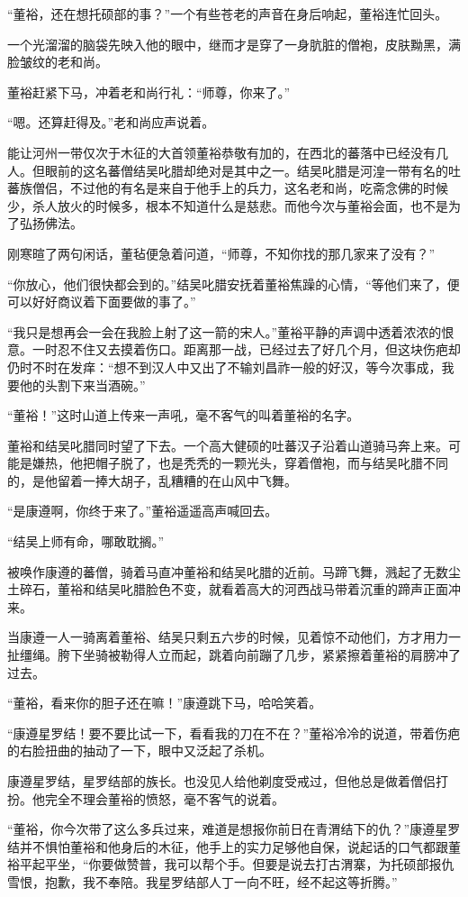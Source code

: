 “董裕，还在想托硕部的事？”一个有些苍老的声音在身后响起，董裕连忙回头。

一个光溜溜的脑袋先映入他的眼中，继而才是穿了一身肮脏的僧袍，皮肤黝黑，满脸皱纹的老和尚。

董裕赶紧下马，冲着老和尚行礼：“师尊，你来了。”

“嗯。还算赶得及。”老和尚应声说着。

能让河州一带仅次于木征的大首领董裕恭敬有加的，在西北的蕃落中已经没有几人。但眼前的这名蕃僧结吴叱腊却绝对是其中之一。结吴叱腊是河湟一带有名的吐蕃族僧侣，不过他的有名是来自于他手上的兵力，这名老和尚，吃斋念佛的时候少，杀人放火的时候多，根本不知道什么是慈悲。而他今次与董裕会面，也不是为了弘扬佛法。

刚寒暄了两句闲话，董毡便急着问道，“师尊，不知你找的那几家来了没有？”

“你放心，他们很快都会到的。”结吴叱腊安抚着董裕焦躁的心情，“等他们来了，便可以好好商议着下面要做的事了。”

“我只是想再会一会在我脸上射了这一箭的宋人。”董裕平静的声调中透着浓浓的恨意。一时忍不住又去摸着伤口。距离那一战，已经过去了好几个月，但这块伤疤却仍时不时在发痒：“想不到汉人中又出了不输刘昌祚一般的好汉，等今次事成，我要他的头割下来当酒碗。”

“董裕！”这时山道上传来一声吼，毫不客气的叫着董裕的名字。

董裕和结吴叱腊同时望了下去。一个高大健硕的吐蕃汉子沿着山道骑马奔上来。可能是嫌热，他把帽子脱了，也是秃秃的一颗光头，穿着僧袍，而与结吴叱腊不同的，是他留着一捧大胡子，乱糟糟的在山风中飞舞。

“是康遵啊，你终于来了。”董裕遥遥高声喊回去。

“结吴上师有命，哪敢耽搁。”

被唤作康遵的蕃僧，骑着马直冲董裕和结吴叱腊的近前。马蹄飞舞，溅起了无数尘土碎石，董裕和结吴叱腊脸色不变，就看着高大的河西战马带着沉重的蹄声正面冲来。

当康遵一人一骑离着董裕、结吴只剩五六步的时候，见着惊不动他们，方才用力一扯缰绳。胯下坐骑被勒得人立而起，跳着向前蹦了几步，紧紧擦着董裕的肩膀冲了过去。

“董裕，看来你的胆子还在嘛！”康遵跳下马，哈哈笑着。

“康遵星罗结！要不要比试一下，看看我的刀在不在？”董裕冷冷的说道，带着伤疤的右脸扭曲的抽动了一下，眼中又泛起了杀机。

康遵星罗结，星罗结部的族长。也没见人给他剃度受戒过，但他总是做着僧侣打扮。他完全不理会董裕的愤怒，毫不客气的说着。

“董裕，你今次带了这么多兵过来，难道是想报你前日在青渭结下的仇？”康遵星罗结并不惧怕董裕和他身后的木征，他手上的实力足够他自保，说起话的口气都跟董裕平起平坐，“你要做赞普，我可以帮个手。但要是说去打古渭寨，为托硕部报仇雪恨，抱歉，我不奉陪。我星罗结部人丁一向不旺，经不起这等折腾。”

